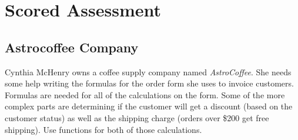 \section{Scored Assessment}

\subsection{Astrocoffee Company}

Cynthia McHenry owns a coffee supply company named \textit{AstroCoffee}. She needs some help writing the formulas for the order form she uses to invoice customers. Formulas are needed for all of the calculations on the form. Some of the more complex parts are determining if the customer will get a discount (based on the customer status) as well as the shipping charge (orders over \$200 get free shipping). Use  functions for both of those calculations.

